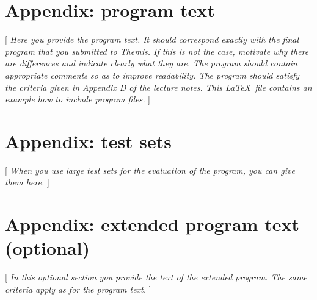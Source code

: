 \documentclass[a4paper]{article}
\begin{document}
\section{Appendix: program text}

[ \textit{Here you provide the program text. 
It should correspond exactly with the final program that you submitted to Themis. 
If this is not the case, motivate why there are differences and indicate clearly what they are. 
The program should contain appropriate comments so as to improve readability. 
The program should satisfy the criteria given in Appendix D of the lecture notes. 
This \LaTeX\ file contains an example how to include program files.} ]



\section{Appendix: test sets}

[ \textit{When you use large test sets for the evaluation of the program, you can give them here.} ]

\section{Appendix: extended program text (optional)}

[ \textit{In this optional section you provide the text of the extended program. 
The same criteria apply as for the program text.} ]
\end{document}
